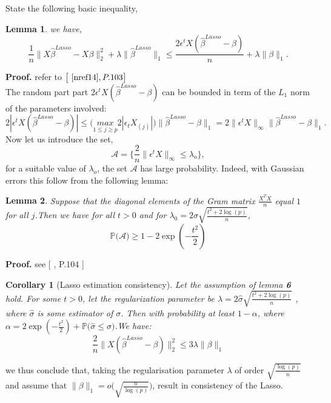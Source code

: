 \documentclass[12pt]{report}
\newtheorem {lemme}{Lemma} %
\newtheorem{corollaire}{Corollary}
\begin{document}
State the following basic inequality,
\begin{lemme}
	we have, 
	\begin{equation}
	\frac{1}{n}\parallel X\hat{\beta}^{Lasso}-X\beta \parallel^{2}_{2} +\lambda\parallel\hat{\beta}^{Lasso} \parallel_{1} \leq \frac{2 \epsilon^{t}X(\hat{\beta}^{Lasso}-\beta)}{n}+\lambda \parallel \beta \parallel_{1}.
	\label{f29}
	\end{equation}
\end{lemme}
\textbf{Proof.} refer to $\big[\ \cite{nref14},P.103 \big]$ \\
The random part part $2 \epsilon^{t}X(\hat{\beta}^{Lasso}-\beta)$ can be bounded in term of the $L_{1}$ norm of the parameters involved:
\begin{equation}
2| \epsilon^{t}X(\hat{\beta}^{Lasso}-\beta)|\leq \big( \underset{1\leq j \geq p}{max}2|\epsilon_{t}X_{(j)}|\big)\parallel \hat{\beta}^{Lasso}-\beta \parallel_{1}=2\parallel \epsilon^{t}X\parallel_{\infty}\parallel \hat{\beta}^{Lasso}-\beta \parallel_{1}.
\label{f30}
\end{equation}
Now let us introduce the set, $$ \mathcal{A}=\big\{ \frac{2}{n}\parallel \epsilon^{t}X\parallel_{\infty} \leq \lambda_{o}\big\},$$
for a suitable value of $\lambda_{o}$, the set $\mathcal{A}$ has large probability. Indeed, with Gaussian errors this follow from the following lemma:
\begin{lemme}
	 Suppose that the diagonal elements of the Gram matrix $\frac{X^{T}X}{n}$ equal $1$ for all $j$.Then we have for all $t>0$ and for $\lambda_{0}=2\sigma\sqrt{\frac{t^{2}+2\log(p)}{n}}$,
	 \begin{equation}
	 	\mathbb{P}\big( \mathcal{A}\big)\geq 1-2\exp(-\frac{t^{2}}{2})
	 	\label{f31}
	 \end{equation}
\end{lemme}
\textbf{Proof.} see [ \cite{nref14}, P.104 ]
\begin{corollaire}[Lasso estimation consistency]
	Let the assumption of lemma \textbf{6} hold. For some $t>0$, let the regularization parameter be $\lambda=2 \hat{\sigma}\sqrt{\frac{t^{2}+2\log(p)}{n}}$ , where $\hat{\sigma}$ is some estimator of $\sigma$. Then with probability at least $1-\alpha$, where $\alpha=2\exp(-\frac{t^{2}}{2})+\mathbb{P}\big(\hat{\sigma}\leq \sigma \big)$.We have:
	\begin{equation}
	\frac{2}{n}\parallel X(\hat{\beta}^{Lasso}-\beta )\parallel^{2}_{2} \leq 3\lambda \parallel \beta \parallel_{1}
	\label{f32}
	\end{equation}
\end{corollaire}
we thus conclude that, taking the regularisation parameter $\lambda$ of order $\sqrt{\frac{\log(p)}{n}}$ and assume that $\parallel \beta \parallel_{1}=o\big(\sqrt{\frac{n}{\log(p)}}\big)$, result in consistency of the Lasso.
\end{document}
